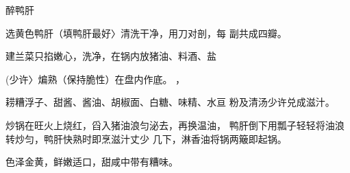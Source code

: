 \begin{recipe}{醉鸭肝}

\ingredients


\cooking

\step 	选黄色鸭肝（填鸭肝最好〉清洗干净，用刀对剖，每 副共成四瓣。

\step 	建兰菜只掐嫩心，洗净，在锅内放猪油、料酒、盐

(少许〉煸熟（保持脆性）在盘内作底。	，

\step 	耢糟浮子、甜酱、酱油、胡椒面、白糖、味精、水亘 粉及清汤少许兑成滋汁。

\step 	炒锅在旺火上烧红，舀入猪油浪匀泌去，再换温油， 鸭肝倒下用瓢子轻轻将油浪转炒匀，鸭肝快熟时即烹滋汁丈少 几下，淋香油将锅两簸即起锅。

\notes

色泽金黄，鲜嫩适口，甜咸中带有糟味。

\end{recipe}


